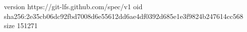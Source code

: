 version https://git-lfs.github.com/spec/v1
oid sha256:2e35cb06dc92fbd7008d6e55612dd6ae4df0392d685e1e3f9824b247614cc568
size 151271
